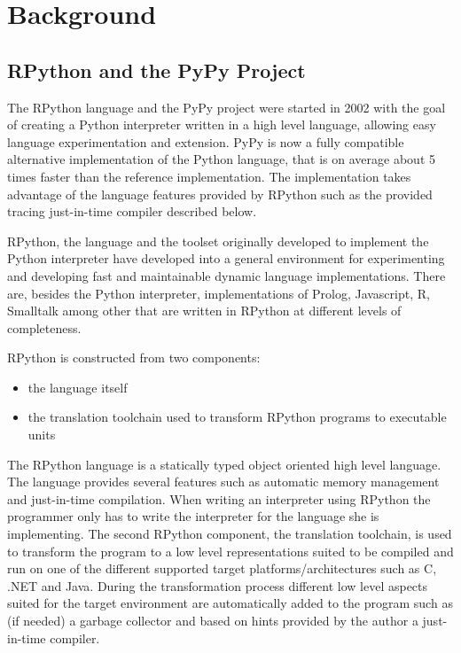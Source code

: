 \documentclass[10pt,preprint]{sigplanconf}
\begin{document}
\section{Background}
\label{sec:Background}

\subsection{RPython and the PyPy Project}
\label{sub:pypy}


The RPython language and the PyPy project were started in 2002 with the goal of
creating a Python interpreter written in a high level language, allowing easy
language experimentation and extension. PyPy is now a fully compatible
alternative implementation of the Python language, that is on average about 5 times faster than the reference implementation. The
implementation takes advantage of the language features provided by RPython
such as the provided tracing just-in-time compiler described below.

RPython, the language and the toolset originally developed to implement the
Python interpreter have developed into a general environment for experimenting
and developing fast and maintainable dynamic language implementations. There
are, besides the Python interpreter, implementations of Prolog, Javascript, R,
Smalltalk among other that are written in RPython at different levels of
completeness.

RPython is constructed from two components:
\begin{itemize}
 \item the language itself
 \item the translation toolchain used to transform RPython programs to executable units
\end{itemize}
The RPython language
is a statically typed object oriented high level language. The language provides
several features such as automatic memory management
and just-in-time compilation. When writing an interpreter using RPython the
programmer only has to write the interpreter for the language she is
implementing.  The second RPython component, the translation toolchain, is used
to transform the program to a low level representations suited to be compiled
and run on one of the different supported target platforms/architectures such
as C, .NET and Java. During the transformation process
different low level aspects suited for the target environment are automatically
added to the program such as (if needed) a garbage collector
and based on hints provided by the author a just-in-time compiler.
\end{document}
